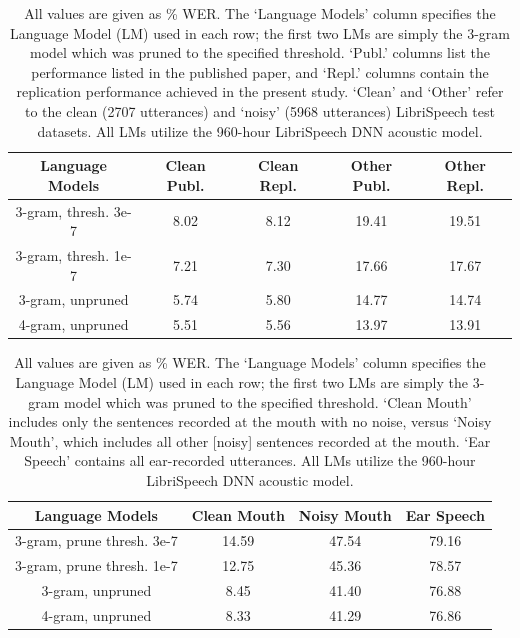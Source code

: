 \begin{table}[h]
\begin{center}
\begin{tabular}{| c || c | c | c | c |} \hline
Language Models & Clean Publ. & Clean Repl. & Other Publ. & Other Repl. \\ \hline\hline
3-gram, thresh. 3e-7 & 8.02 & 8.12 & 19.41 & 19.51 \\ \hline
3-gram, thresh. 1e-7 & 7.21 & 7.30 & 17.66 & 17.67 \\ \hline
3-gram, unpruned & 5.74 & 5.80 & 14.77 & 14.74 \\ \hline
4-gram, unpruned & 5.51 & 5.56 & 13.97 & 13.91 \\ \hline
\end{tabular}
\end{center}
\caption{All values are given as \% WER.  The `Language Models' column specifies the Language Model (LM) used in each row; the first two LMs are simply the 3-gram model which was pruned to the specified threshold.  `Publ.' columns list the performance listed in the published paper, and `Repl.' columns contain the replication performance achieved in the present study.  `Clean' and `Other' refer to the clean (2707 utterances) and `noisy' (5968 utterances) LibriSpeech test datasets. All LMs utilize the 960-hour LibriSpeech DNN acoustic model.}\label{tab:sanity-check}
\end{table}

\begin{table}[h]
\begin{center}
\begin{tabular}{| c || c | c | c |} \hline
Language Models & Clean Mouth & Noisy Mouth & Ear Speech \\ \hline\hline
3-gram, prune thresh. 3e-7 & 14.59 & 47.54 & 79.16 \\ \hline
3-gram, prune thresh. 1e-7 & 12.75 & 45.36 & 78.57 \\ \hline
3-gram, unpruned & 8.45 & 41.40 & 76.88 \\ \hline
4-gram, unpruned & 8.33 & 41.29 & 76.86 \\ \hline
\end{tabular}
\end{center}
\caption{All values are given as \% WER. The `Language Models' column specifies the Language Model (LM) used in each row; the first two LMs are simply the 3-gram model which was pruned to the specified threshold.  `Clean Mouth' includes only the sentences recorded at the mouth with no noise, versus `Noisy Mouth', which includes all other [noisy] sentences recorded at the mouth. `Ear Speech' contains all ear-recorded utterances.  All LMs utilize the 960-hour LibriSpeech DNN acoustic model.}\label{tab:basic-run}
\end{table}

